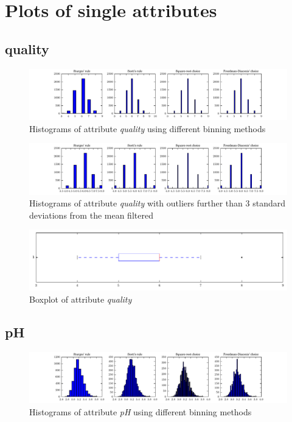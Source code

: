 \documentclass{report}
\begin{document}
\section{Plots of single attributes}

\subsection{quality}
\begin{figure}[H]
\includegraphics[width=\textwidth]{histograms/quality.pdf}
\caption{Histograms of attribute \emph{quality} using different binning methods}\end{figure}

\begin{figure}[H]
\includegraphics[width=\textwidth]{histograms/quality_filtered.pdf}
\caption{Histograms of attribute \emph{quality} with outliers further than 3 standard deviations from the mean filtered}\n\end{figure}

\begin{figure}[H]
\includegraphics[width=\textwidth]{boxplots/quality.pdf}
\caption{Boxplot of attribute \emph{quality}}\end{figure}

\newpage\subsection{pH}
\begin{figure}[H]
\includegraphics[width=\textwidth]{histograms/pH.pdf}
\caption{Histograms of attribute \emph{pH} using different binning methods}\end{figure}
\end{document}

